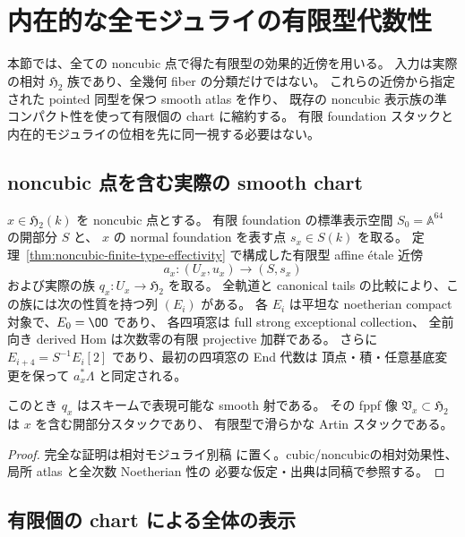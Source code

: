 \section{内在的な全モジュライの有限型代数性}
\label{sec:global-h2-smooth-atlas}

本節では、全ての noncubic 点で得た有限型の効果的近傍を用いる。
入力は実際の相対 $\mathfrak H_2$ 族であり、全幾何 fiber の分類だけではない。
これらの近傍から指定された pointed 同型を保つ smooth atlas を作り、
既存の noncubic 表示族の準コンパクト性を使って有限個の chart に縮約する。
有限 foundation スタックと内在的モジュライの位相を先に同一視する必要はない。

\subsection{noncubic 点を含む実際の smooth chart}

\begin{corollary}
\label{cor:noncubic-effective-smooth-neighborhood}
$x\in\mathfrak H_2(k)$ を noncubic 点とする。
有限 foundation の標準表示空間 $S_0=\mathbb A^{64}$ の開部分 $S$ と、
$x$ の normal foundation を表す点 $s_x\in S(k)$ を取る。
定理~\ref{thm:noncubic-finite-type-effectivity} で構成した有限型 affine étale 近傍
\[
 a_x:(U_x,u_x)\longrightarrow(S,s_x)
\]
および実際の族 $q_x:U_x\to\mathfrak H_2$ を取る。
全軌道と canonical tails の比較により、この族には次の性質を持つ列 $(E_i)$ がある。
各 $E_i$ は平坦な noetherian compact 対象で、$E_0=\OO$ であり、
各四項窓は full strong exceptional collection、
全前向き derived Hom は次数零の有限 projective 加群である。
さらに $E_{i+4}=S^{-1}E_i[2]$ であり、最初の四項窓の End 代数は
頂点・積・任意基底変更を保って $a_x^*\Lambda$ と同定される。

このとき $q_x$ はスキームで表現可能な smooth 射である。
その fppf 像 $\mathfrak V_x\subset\mathfrak H_2$ は $x$ を含む開部分スタックであり、
有限型で滑らかな Artin スタックである。
\end{corollary}

\begin{proof}
完全な証明は相対モジュライ別稿
\cite[内在的モジュライの有限型代数性・滑らかさ・境界]{QuadricModuli2026}
に置く。cubic/noncubicの相対効果性、局所 atlas と全次数 Noetherian 性の
必要な仮定・出典は同稿で参照する。
\end{proof}

\subsection{有限個の chart による全体の表示}

